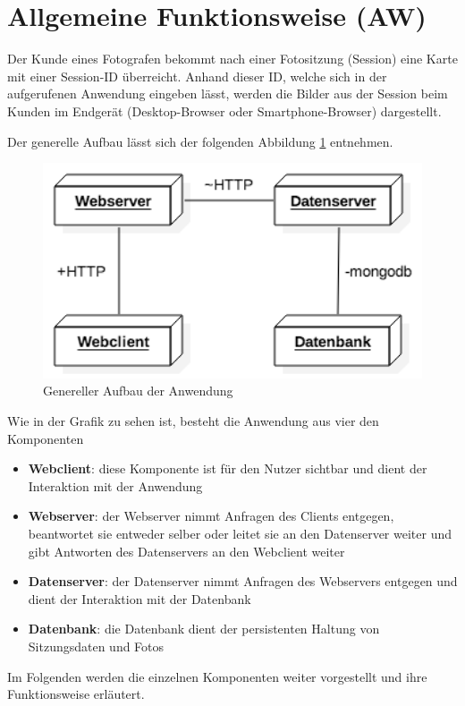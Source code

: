 \section{Allgemeine Funktionsweise (AW)}
Der Kunde eines Fotografen bekommt nach einer Fotositzung (Session) eine Karte mit 
einer Session-ID überreicht. Anhand dieser ID, welche sich in der aufgerufenen 
Anwendung eingeben lässt, werden die Bilder aus der Session beim Kunden im Endgerät
(Desktop-Browser oder Smartphone-Browser) dargestellt.

Der generelle Aufbau lässt sich der folgenden Abbildung \ref{fig_genereller_aufbau} entnehmen.

\begin{figure}[h]
	\centering
	\includegraphics[width=14cm]{bilder/genereller_aufbau}
	\caption{Genereller Aufbau der Anwendung}
	\label{fig_genereller_aufbau}
\end{figure}

Wie in der Grafik zu sehen ist, besteht die Anwendung aus vier den Komponenten
\begin{itemize}
	\item \textbf{Webclient}: diese Komponente ist für den Nutzer sichtbar und dient der Interaktion mit der Anwendung
	\item \textbf{Webserver}: der Webserver nimmt Anfragen des Clients entgegen, beantwortet sie entweder selber oder leitet sie an den Datenserver weiter und gibt Antworten des Datenservers an den Webclient weiter
	\item \textbf{Datenserver}: der Datenserver nimmt Anfragen des Webservers entgegen und dient der Interaktion mit der Datenbank
	\item \textbf{Datenbank}: die Datenbank dient der persistenten Haltung von Sitzungsdaten und Fotos
\end{itemize}

Im Folgenden werden die einzelnen Komponenten weiter vorgestellt und ihre Funktionsweise erläutert.